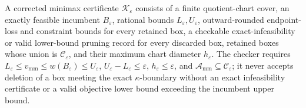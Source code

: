 A corrected minimax certificate \(\mathscr K_{\varepsilon}\) consists of a finite quotient-chart cover, an exactly feasible incumbent \(B_{\varepsilon}\), rational bounds \(L_{\varepsilon},U_{\varepsilon}\), outward-rounded endpoint-loss and constraint bounds for every retained box, a checkable exact-infeasibility or valid lower-bound pruning record for every discarded box, retained boxes whose union is \(\mathcal C_\varepsilon\), and their maximum chart diameter \(h_{\varepsilon}\).  The checker requires \(L_{\varepsilon}\le v_{\mathrm{mm}}\le w(B_{\varepsilon})\le U_{\varepsilon}\), \(U_{\varepsilon}-L_{\varepsilon}\le\varepsilon\), \(h_{\varepsilon}\le\varepsilon\), and \(\mathcal A_{\mathrm{mm}}\subseteq\mathcal C_\varepsilon\); it never accepts deletion of a box meeting the exact \(\kappa\)-boundary without an exact infeasibility certificate or a valid objective lower bound exceeding the incumbent upper bound.